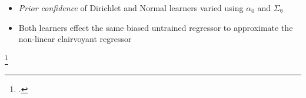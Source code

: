 \documentclass[aspectratio=169]{beamer}
\begin{document}
\begin{frame}
\begin{columns}[T]
\begin{column}{.5\linewidth}
\end{column}

\end{columns}

\vspace{1em}

\begin{itemize}
\item \emph{Prior confidence} of Dirichlet and Normal learners varied using $\alpha_0$ and $\Sigma_{\uptheta}$
\vspace{.5em}
\item Both learners effect the same \alert{biased} untrained regressor to approximate the non-linear clairvoyant regressor
\end{itemize}


\footcitetext{theodoridis-ML}

\end{frame}
\end{document}
